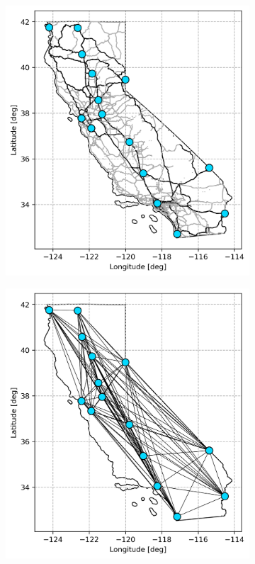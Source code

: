 \begin{figure}[H]
	\centering
	\begin{subfigure}[t]{.5\linewidth}
		\centering\captionsetup{width = .8\linewidth}
		\includegraphics[width = \linewidth]{figs/full_graph.png}
	\end{subfigure}%
	\begin{subfigure}[t]{.5\linewidth}
		\centering\captionsetup{width = .8\linewidth}
		\includegraphics[width = \linewidth]{figs/reduced_graph.png}

\end{subfigure}
\end{figure}
